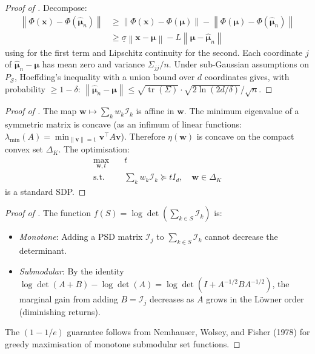 \documentclass{article}
\newcommand{\Nset}{\mathcal{S}}  %
\newcommand{\norm}[1]{\left\lVert#1\right\rVert}
\DeclareMathOperator{\tr}{tr}
\begin{document}
\begin{proof}[Proof of ]
Decompose:
\begin{align*}
\norm{\Phi(\mathbf{x}) - \Phi(\hat{\bm{\mu}}_n)} &\geq \norm{\Phi(\mathbf{x}) - \Phi(\bm{\mu})} - \norm{\Phi(\bm{\mu}) - \Phi(\hat{\bm{\mu}}_n)} \\
&\geq \underline{\sigma}\norm{\mathbf{x}-\bm{\mu}} - L\norm{\bm{\mu} - \hat{\bm{\mu}}_n}
\end{align*}
using  for the first term and Lipschitz continuity for the second. Each coordinate $j$ of $\hat{\bm{\mu}}_n - \bm{\mu}$ has mean zero and variance $\Sigma_{jj}/n$. Under sub-Gaussian assumptions on $P_\Nset$, Hoeffding's inequality with a union bound over $d$ coordinates gives, with probability $\geq 1 - \delta$:
$\norm{\hat{\bm{\mu}}_n - \bm{\mu}} \leq \sqrt{\tr(\Sigma)} \cdot \sqrt{2\ln(2d/\delta)} / \sqrt{n}$.
\end{proof}

\begin{proof}[Proof of ]
The map $\mathbf{w} \mapsto \sum_k w_k \mathcal{I}_k$ is affine in $\mathbf{w}$. The minimum eigenvalue of a symmetric matrix is concave (as an infimum of linear functions: $\lambda_{\min}(A) = \min_{\norm{\mathbf{v}}=1} \mathbf{v}^\top A\mathbf{v}$). Therefore $\eta(\mathbf{w})$ is concave on the compact convex set $\Delta_K$. The optimisation:
\begin{align*}
\max_{\mathbf{w}, t} \quad & t \\
\text{s.t.} \quad & \textstyle\sum_k w_k \mathcal{I}_k \succeq t I_d, \quad \mathbf{w} \in \Delta_K
\end{align*}
is a standard SDP.
\end{proof}

\begin{proof}[Proof of ]
The function $f(S) = \log\det(\sum_{k \in S} \mathcal{I}_k)$ is:
\begin{itemize}
    \item \emph{Monotone}: Adding a PSD matrix $\mathcal{I}_j$ to $\sum_{k \in S} \mathcal{I}_k$ cannot decrease the determinant.
    \item \emph{Submodular}: By the identity $\log\det(A+B) - \log\det(A) = \log\det(I + A^{-1/2}BA^{-1/2})$, the marginal gain from adding $B = \mathcal{I}_j$ decreases as $A$ grows in the L\"{o}wner order (diminishing returns).
\end{itemize}
The $(1-1/e)$ guarantee follows from Nemhauser, Wolsey, and Fisher (1978) for greedy maximisation of monotone submodular set functions.
\end{proof}
\end{document}
